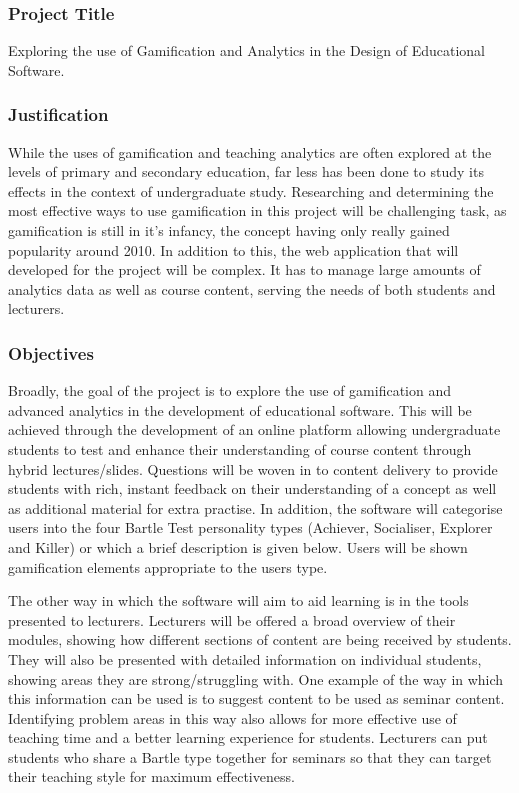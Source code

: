 \subsubsection*{Project Title}
Exploring the use of Gamification and Analytics in the Design of Educational Software.
\subsubsection*{Justification}
While the uses of gamification and teaching analytics are often explored at the levels of primary and secondary education, far less has been done to study its effects in the context of undergraduate study. Researching and determining the most effective ways to use gamification in this project will be challenging task, as gamification is still in it's infancy, the concept having only really gained popularity around 2010. In addition to this, the web application that will developed for the project will be complex. It has to manage large amounts of analytics data as well as course content, serving the needs of both students and lecturers.
\subsubsection*{Objectives}
Broadly, the goal of the project is to explore the use of gamification and advanced analytics in the development of educational software. This will be achieved through the development of an online platform allowing undergraduate students to test and enhance their understanding of course content through hybrid lectures/slides. Questions will be woven in to content delivery to provide students with rich, instant feedback on their understanding of a concept as well as additional material for extra practise. In addition, the software will categorise users into the four Bartle Test personality types (Achiever, Socialiser, Explorer and Killer) or which a brief description is given below. Users will be shown gamification elements appropriate to the users type.

The other way in which the software will aim to aid learning is in the tools presented to lecturers. Lecturers will be offered a broad overview of their modules, showing how different sections of content are being received by students. They will also be presented with detailed information on individual students, showing areas they are strong/struggling with. One example of the way in which this information can be used is to suggest content to be used as seminar content. Identifying problem areas in this way also allows for more effective use of teaching time and a better learning experience for students. Lecturers can put students who share a Bartle type together for seminars so that they can target their teaching style for maximum effectiveness.


